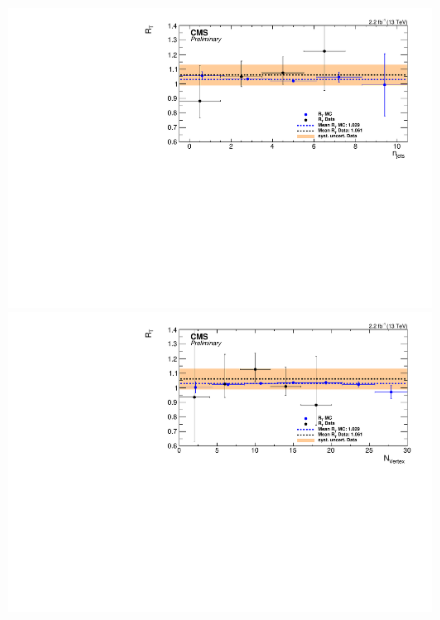 \begin{figure}[htbp]
  \begin{minipage}[t]{0.3\textwidth}
    \includegraphics[width=\textwidth]{bkgd/figs/Triggereff_SFvsOF_Syst_PFHT_HighHTExclusiveForward_Run2015_25ns_NJets_None_NonIso_MC.pdf}
  \end{minipage}
  \begin{minipage}[t]{0.3\textwidth}
    \includegraphics[width=\textwidth]{bkgd/figs/Triggereff_SFvsOF_Syst_PFHT_HighHTExclusiveForward_Run2015_25ns_nVtx_None_NonIso_MC.pdf}
  \end{minipage}
  \begin{minipage}[t]{0.3\textwidth}

\end{minipage}
\end{figure}
